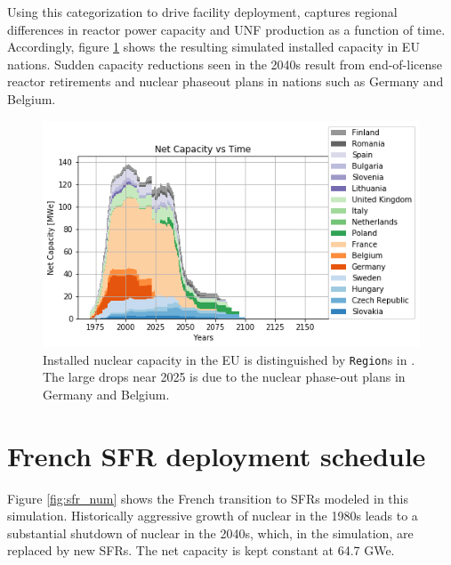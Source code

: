 Using this categorization to drive facility deployment, \Cyclus captures 
regional differences in reactor power capacity and \gls{UNF} production as a 
function of time. Accordingly, figure \ref{fig:eu_pow} shows the resulting simulated 
installed capacity in \gls{EU} nations.  Sudden capacity reductions seen in the 
2040s result from end-of-license reactor retirements and nuclear phaseout plans 
in nations such as Germany and Belgium.  

\begin{figure}[htbp!]
    \begin{center}
        \includegraphics[scale=0.7]{./images/eu_future/power_plot.png}
    \end{center}
    \caption{Installed nuclear capacity in the EU is distinguished by \texttt{Region}s in \Cyclus.
             The large drops near 2025 is due to the nuclear phase-out plans in Germany and Belgium.}
    \label{fig:eu_pow}
\end{figure}



\section{French \gls{SFR} deployment schedule}

Figure \ref{fig:sfr_num}
shows
the French transition to \glspl{SFR} modeled in this simulation.
Historically aggressive growth of nuclear in the 1980s leads to a substantial 
shutdown of nuclear in the 2040s, which, in the simulation, are replaced by new 
\glspl{SFR}. The net capacity is kept constant at 64.7 GWe.

